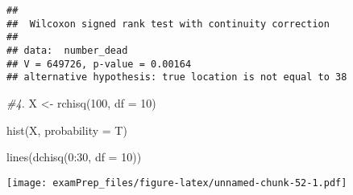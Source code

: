 \documentclass[
]{article}
\newenvironment{Shaded}{\begin{snugshade}}{\end{snugshade}}
\newcommand{\AttributeTok}[1]{\textcolor[rgb]{0.77,0.63,0.00}{#1}}
\newcommand{\CommentTok}[1]{\textcolor[rgb]{0.56,0.35,0.01}{\textit{#1}}}
\newcommand{\DecValTok}[1]{\textcolor[rgb]{0.00,0.00,0.81}{#1}}
\newcommand{\FunctionTok}[1]{\textcolor[rgb]{0.00,0.00,0.00}{#1}}
\newcommand{\NormalTok}[1]{#1}
\newcommand{\OtherTok}[1]{\textcolor[rgb]{0.56,0.35,0.01}{#1}}
\newcommand{\SpecialCharTok}[1]{\textcolor[rgb]{0.00,0.00,0.00}{#1}}
\begin{document}
\begin{verbatim}
## 
##  Wilcoxon signed rank test with continuity correction
## 
## data:  number_dead
## V = 649726, p-value = 0.00164
## alternative hypothesis: true location is not equal to 38
\end{verbatim}

\begin{Shaded}
\begin{Highlighting}[]
\CommentTok{\#4.}
\NormalTok{X }\OtherTok{\textless{}{-}} \FunctionTok{rchisq}\NormalTok{(}\DecValTok{100}\NormalTok{, }\AttributeTok{df =} \DecValTok{10}\NormalTok{)}

\FunctionTok{hist}\NormalTok{(X, }\AttributeTok{probability =}\NormalTok{ T)}

\FunctionTok{lines}\NormalTok{(}\FunctionTok{dchisq}\NormalTok{(}\DecValTok{0}\SpecialCharTok{:}\DecValTok{30}\NormalTok{, }\AttributeTok{df =} \DecValTok{10}\NormalTok{))}
\end{Highlighting}
\end{Shaded}

\texttt{[image: examPrep\_files/figure-latex/unnamed-chunk-52-1.pdf]}
\end{document}
